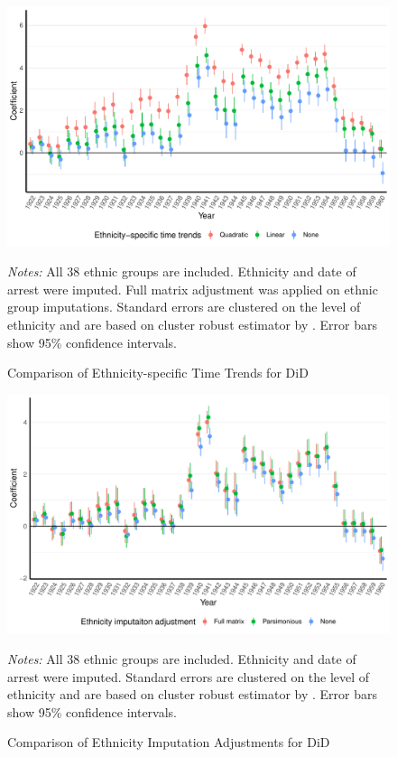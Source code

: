  \begin{figure}[H]
\centering
\caption{Comparison of  Ethnicity-specific Time Trends for DiD}
\includegraphics[width=\textwidth]{plots/effects/robustness_checks/trends_comp_pred_full_imp_date_cr2.pdf}
\begin{minipage}{\textwidth}
\footnotesize
\emph{Notes:} All 38 ethnic groups are included. Ethnicity and date of arrest were imputed.  Full matrix adjustment was applied on ethnic group imputations.  Standard errors are clustered on the level of ethnicity and are based on cluster robust estimator by \citet{pustejovsky_small-sample_2018}. Error bars show 95\% confidence intervals. 
\end{minipage}
\label{fig:did_robustness_time_trends}
\end{figure}

 \begin{figure}[H]
\centering
\caption{Comparison of  Ethnicity Imputation Adjustments for DiD}
\includegraphics[width=\textwidth]{plots/effects/robustness_checks/pred_adj_comp_pred_full_imp_date_cr2.pdf}
\begin{minipage}{0.92\textwidth}
\footnotesize
\emph{Notes:} All 38 ethnic groups are included. Ethnicity and date of arrest were imputed. Standard errors are clustered on the level of ethnicity and are based on cluster robust estimator by \citet{pustejovsky_small-sample_2018}. Error bars show 95\% confidence intervals. 
\end{minipage}
\label{fig:did_robustness_pred_adj}
\end{figure}

